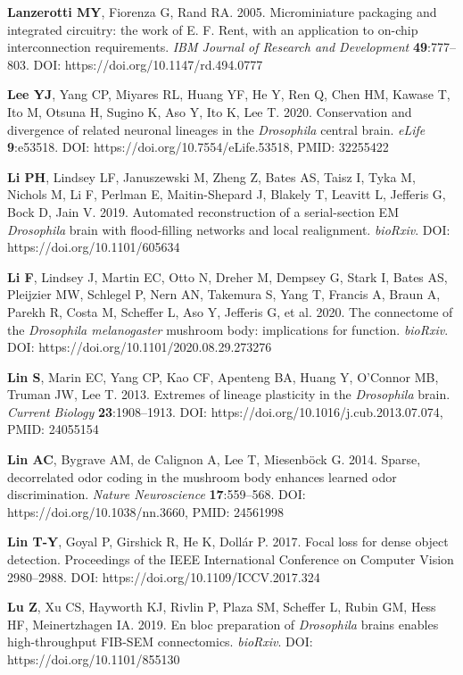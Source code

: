 \documentclass{article}
\begin{document}
\begin{hangpars}
\textbf{Lanzerotti MY}, Fiorenza G, Rand RA. 2005. Microminiature packaging and integrated circuitry: the work of E. F. Rent, with an application to on-chip interconnection requirements. \emph{IBM Journal of Research and Development} \textbf{49}:777–803. DOI: https://doi.org/10.1147/rd.494.0777

\textbf{Lee YJ}, Yang CP, Miyares RL, Huang YF, He Y, Ren Q, Chen HM, Kawase T, Ito M, Otsuna H, Sugino K, Aso Y, Ito K, Lee T. 2020. Conservation and divergence of related neuronal lineages in the \emph{Drosophila} central brain. \emph{eLife} \textbf{9}:e53518. DOI: https://doi.org/10.7554/eLife.53518, PMID: 32255422

\textbf{Li PH}, Lindsey LF, Januszewski M, Zheng Z, Bates AS, Taisz I, Tyka M, Nichols M, Li F, Perlman E, Maitin-Shepard J, Blakely T, Leavitt L, Jefferis G, Bock D, Jain V. 2019. Automated reconstruction of a serial-section EM \emph{Drosophila} brain with flood-filling networks and local realignment. \emph{bioRxiv}. DOI: https://doi.org/10.1101/605634

\textbf{Li F}, Lindsey J, Martin EC, Otto N, Dreher M, Dempsey G, Stark I, Bates AS, Pleijzier MW, Schlegel P, Nern AN, Takemura S, Yang T, Francis A, Braun A, Parekh R, Costa M, Scheffer L, Aso Y, Jefferis G, et al. 2020. The connectome of the \emph{Drosophila melanogaster} mushroom body: implications for function. \emph{bioRxiv}. DOI: https://doi.org/10.1101/2020.08.29.273276

\textbf{Lin S}, Marin EC, Yang CP, Kao CF, Apenteng BA, Huang Y, O’Connor MB, Truman JW, Lee T. 2013. Extremes of lineage plasticity in the \emph{Drosophila} brain. \emph{Current Biology} \textbf{23}:1908–1913. DOI: https://doi.org/10.1016/j.cub.2013.07.074, PMID: 24055154

\textbf{Lin AC}, Bygrave AM, de Calignon A, Lee T, Miesenböck G. 2014. Sparse, decorrelated odor coding in the mushroom body enhances learned odor discrimination. \emph{Nature Neuroscience} \textbf{17}:559–568. DOI: https://doi.org/10.1038/nn.3660, PMID: 24561998

\textbf{Lin T-Y}, Goyal P, Girshick R, He K, Dollár P. 2017. Focal loss for dense object detection. Proceedings of the IEEE International Conference on Computer Vision 2980–2988. DOI: https://doi.org/10.1109/ICCV.2017.324

\textbf{Lu Z}, Xu CS, Hayworth KJ, Rivlin P, Plaza SM, Scheffer L, Rubin GM, Hess HF, Meinertzhagen IA. 2019. En bloc preparation of \emph{Drosophila} brains enables high-throughput FIB-SEM connectomics. \emph{bioRxiv}. DOI: https://doi.org/10.1101/855130


\end{hangpars}
\end{document}
